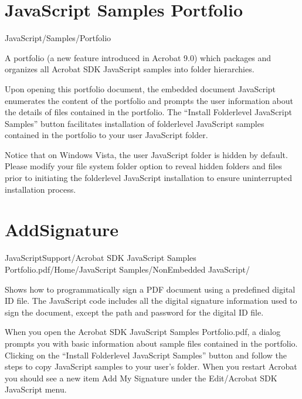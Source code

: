 \documentclass[letterpaper,12pt,english,openany,oneside]{sphinxmanual}
\begin{document}
\section{JavaScript Samples Portfolio}
\label{\detokenize{Samples_JavaScript:javascript-samples-portfolio}}

JavaScript/Samples/Portfolio


A portfolio (a new feature introduced in Acrobat 9.0) which packages and organizes all Acrobat SDK JavaScript samples into folder hierarchies.

Upon opening this portfolio document, the embedded document JavaScript enumerates the content of the portfolio and prompts the user information about the details of files contained in the portfolio. The “Install Folder\sphinxhyphen{}level JavaScript Samples” button facilitates installation of folder\sphinxhyphen{}level JavaScript samples contained in the portfolio to your user JavaScript folder.

Notice that on Windows Vista, the user JavaScript folder is hidden by default. Please modify your file system folder option to reveal hidden folders and files prior to initiating the folder\sphinxhyphen{}level JavaScript installation to ensure uninterrupted installation process.


\section{AddSignature}
\label{\detokenize{Samples_JavaScript:addsignature}}\label{\detokenize{Samples_JavaScript:location-1}}

JavaScriptSupport/Acrobat SDK JavaScript Samples Portfolio.pdf/Home/JavaScript Samples/Non\sphinxhyphen{}Embedded JavaScript/

\label{\detokenize{Samples_JavaScript:description-1}}

Shows how to programmatically sign a PDF document using a predefined digital ID file. The JavaScript code includes all the digital signature information used to sign the document, except the path and password for the digital ID file.

When you open the Acrobat SDK JavaScript Samples Portfolio.pdf, a dialog prompts you with basic information about sample files contained in the portfolio. Clicking on the “Install Folder\sphinxhyphen{}level JavaScript Samples” button and follow the steps to copy JavaScript samples to your user’s  folder. When you restart Acrobat you should see a new item Add My Signature under the Edit/Acrobat SDK JavaScript menu.
\end{document}
